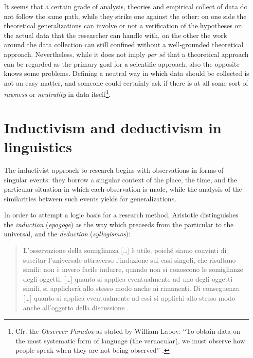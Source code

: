 \documentclass[a4paper,twoside,12pt,chapterprefix=false,bibliography=totocnumbered,listof=flat]{scrbook}
\begin{document}
\noindent It seems that a certain grade of analysis, theories and
empirical collect of data do not follow the same path, while they strike
one against the other: on one side the theoretical generalizations can
involve or not a verification of the hypotheses on the actual data that
the researcher can handle with, on the other the work around the data
collection can still confined without a well-grounded theoretical
approach. Nevertheless, while it does not imply \emph{per sé} that a
theoretical approach can be regarded as the primary goal for a
scientific approach, also the opposite knows some problems. Defining a
neutral way in which data should be collected is not an easy matter, and
someone could certainly ask if there is at all some sort of
\emph{rawness} or \emph{neutrality} in data itself\footnote{Cfr. the
  \emph{Observer Paradox} as stated by William Labov: \enquote{To obtain
  data on the most systematic form of language (the vernacular), we must
  observe how people speak when they are not being observed}
  \citep[xvii]{labov1973}.}.

\section{Inductivism and deductivism in
linguistics}\label{inductivism-and-deductivism-in-linguistics}

The inductivist approach to research begins with observations in forms
of singular events: they borrow a singular context of the place, the
time, and the particular situation in which each observation is made,
while the analysis of the similarities between such events yields for
generalizations.

In order to attempt a logic basis for a research method, Aristotle
distinguishes the \emph{induction} (\emph{epagōgē}) as the way which
preceeds from the particular to the universal, and the \emph{deduction}
(\emph{syllogismos}):

\begin{quote}
L'osservazione della somiglianza {[}\ldots{}{]} è utile, poiché siamo
convinti di suscitar l'universale attraverso l'induzione sui casi
singoli, che risultano simili: non è invero facile indurre, quando non
si conoscono le somiglianze degli oggetti. {[}\ldots{}{]} quanto si
applica eventualmente ad uno degli oggetti simili, si applicherà allo
stesso modo anche ai rimanenti. Di conseguenza {[}\ldots{}{]} quanto si
applica eventualmente ad essi si applichi allo stesso modo anche
all'oggetto della discussione \citep[ \emph{Topici}
1.18.108b]{aristoteleOrganon}.
\end{quote}
\end{document}
